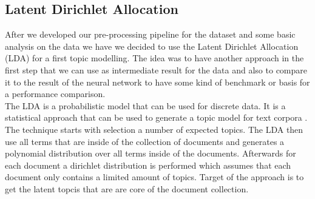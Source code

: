 \subsection{Latent Dirichlet Allocation} %
\label{sub:lda}
After we developed our pre-processing pipeline for the dataset and some basic analysis on the data we have we decided to use the Latent Dirichlet Allocation (LDA) for a first topic modelling. The idea was to have another approach in the first step that we can use as intermediate result for the data and also to compare it to the result of the neural network to have some kind of benchmark or basis for a performance comparison.\\
The LDA is a probabilistic model that can be used for discrete data. It is a statistical approach that can be used to generate a topic model for text corpora \cite{blei_latent_nodate}. The technique starts with selection a number of expected topics. The LDA then use all terms that are inside of the collection of documents and generates a polynomial distribution over all terms inside of the documents. Afterwards for each document a dirichlet distribution is performed which assumes that each document only contains a limited amount of topics. Target of the approach is to get the latent topcis that are are core of the document collection.
